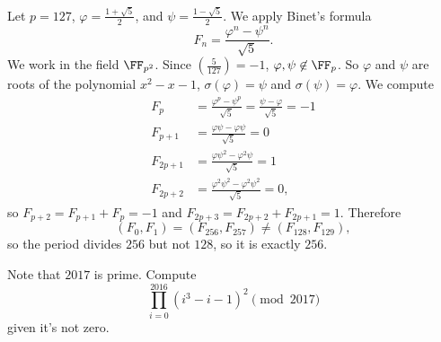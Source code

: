 \documentclass[11pt]{scrartcl}
\begin{document}
\begin{solution}{}
    Let $p = 127$, $\varphi = \frac{1 + \sqrt5}2$, and $\psi = \frac{1 - \sqrt5}2$. We apply Binet's formula
    \[F_n = \frac{\varphi^n - \psi^{n}}{\sqrt5}.\]
    We work in the field $\FF_{p^2}$. Since $(\frac{5}{127}) = -1$, $\varphi,\psi \not\in \FF_p$. So $\varphi$ and $\psi$ are roots of the polynomial $x^2 - x - 1$, $\sigma(\varphi) = \psi$ and $\sigma(\psi) = \varphi$. We compute
    \begin{align*}
        F_p &= \frac{\varphi^p - \psi^p}{\sqrt5} = \frac{\psi - \varphi}{\sqrt5} = -1 \\
        F_{p + 1} &= \frac{\varphi\psi - \varphi\psi}{\sqrt5} = 0 \\
        F_{2p + 1} &= \frac{\varphi\psi^2 - \varphi^2\psi}{\sqrt5} = 1 \\
        F_{2p + 2} &= \frac{\varphi^2\psi^2 - \varphi^2\psi^2}{\sqrt5} = 0,
    \end{align*}
    so $F_{p + 2} = F_{p + 1} + F_p = -1$ and $F_{2p + 3} = F_{2p + 2} + F_{2p + 1} = 1$. Therefore
    \[(F_0,F_1) = (F_{256},F_{257}) \neq (F_{128},F_{129}),\]
    so the period divides $256$ but not $128$, so it is exactly $256$.
\end{solution}

\begin{example}\label{exa:cubic_discriminant}
    Note that $2017$ is prime. Compute
    \[\prod_{i = 0}^{2016}(i^3 - i - 1)^2 \pmod{2017}\]
    given it's not zero.
\end{example}
\end{document}
